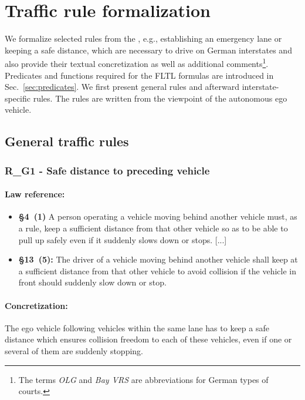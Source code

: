 
\section{Traffic rule formalization}
\label{sec:formalization}
We formalize selected rules from the \stvo, e.g., establishing an emergency lane or keeping a safe distance, which are necessary to drive on German interstates and also provide their textual concretization as well as additional comments\footnote{The terms \textit{OLG} and \textit{Bay VRS}  are abbreviations for German types of courts.}. Predicates and functions required for the FLTL formulas are introduced in Sec.~\ref{sec:predicates}. We first present general rules and afterward interstate-specific rules. The rules are written from the viewpoint of the autonomous ego vehicle.


\subsection{General traffic rules}
\subsubsection{R\_G1 - Safe distance to preceding vehicle} 
\paragraph{Law reference:} 
\begin{itemize}
	\item \textbf{\stvo \S 4~(1)} A person operating a vehicle moving behind another vehicle must, as a rule, keep a sufficient distance from that other vehicle so as to be able to pull up safely even if it suddenly slows down or stops. [...]
	\item \textbf{\vcort \S 13~(5):} The  driver  of  a  vehicle  moving  behind  another  vehicle  shall  keep  at a  sufficient distance from that other vehicle to avoid collision if the vehicle in front should suddenly slow down or stop. 
\end{itemize}

\paragraph{Concretization:} The ego vehicle following vehicles within the same lane has to keep a safe distance which ensures collision freedom to each of these vehicles, even if one or several of them are suddenly stopping.

